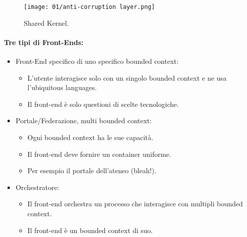 
\begin{figure}[h]
	\begin{center}
		\texttt{[image: 01/anti-corruption layer.png]}
	\end{center}
	\caption{Shared Kernel.}
\end{figure}

\paragraph{Tre tipi di Front-Ends:}

\begin{itemize}
	\item Front-End specifico di uno specifico bounded context:
	      \begin{itemize}
		      \item L'utente interagisce solo con un singolo bounded context e ne usa l'ubiquitous languages.
		      \item Il front-end è solo questioni di scelte tecnologiche.
	      \end{itemize}
	\item Portale/Federazione, multi bounded context:
	      \begin{itemize}
		      \item Ogni bounded context ha le sue capacità.
		      \item Il front-end deve fornire un container uniforme.
		      \item Per esempio il portale dell'ateneo (bleah!).
	      \end{itemize}
	\item Orchestratore:
	      \begin{itemize}
		      \item Il front-end orchestra un processo che interagisce con multipli bounded context.
		      \item Il front-end è un bounded context di suo.
	      \end{itemize}
\end{itemize}

